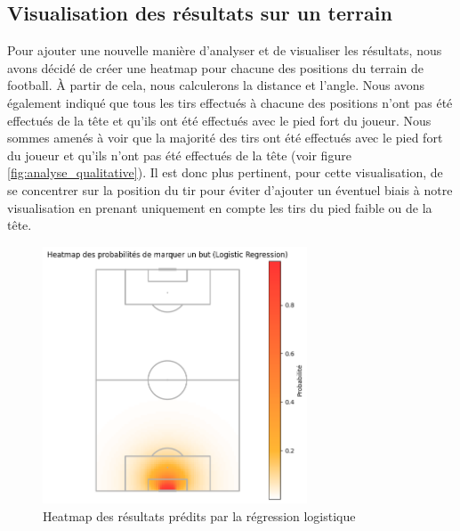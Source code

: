 \documentclass[12pt]{article}
\begin{document}
\newpage

\subsection{Visualisation des résultats sur un terrain}
Pour ajouter une nouvelle manière d'analyser et de visualiser les résultats, nous avons décidé de créer une heatmap pour chacune des positions du terrain de football.
À partir de cela, nous calculerons la distance et l'angle.
Nous avons également indiqué que tous les tirs effectués à chacune des positions n'ont pas été effectués de la tête et qu'ils ont été effectués avec le pied fort du joueur.
Nous sommes amenés à voir que la majorité des tirs ont été effectués avec le pied fort du joueur et qu'ils n'ont pas été effectués de la tête (voir figure \ref{fig:analyse_qualitative}).
Il est donc plus pertinent, pour cette visualisation, de se concentrer sur la position du tir pour éviter d'ajouter un éventuel biais à notre visualisation en prenant uniquement en compte les tirs du pied faible ou de la tête.

\begin{figure}[htp]
    \centering
    \includegraphics[width=0.7\textwidth]{img/pitch_visualisation_log_reg.png}
    \caption{Heatmap des résultats prédits par la régression logistique}
    \label{fig:result_log_reg}
\end{figure}
\end{document}
